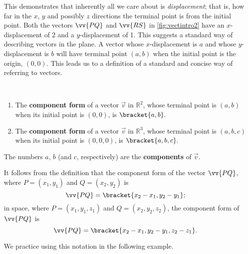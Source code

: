 This demonstrates that inherently all we care about is \emph{displacement}; that is, how far in the $x$, $y$ and possibly $z$ directions the terminal point is from the initial point. Both the vectors $\vv{PQ}$ and $\vv{RS}$ in \autoref{fig:vectintro2} have an $x$-displacement of 2 and a $y$-displacement of 1. This suggests a standard way of describing vectors in the plane. A vector whose $x$-displacement is $a$ and whose $y$-displacement is $b$ will have terminal point $(a,b)$ when the initial point is the origin, $(0,0)$. This leads us to a definition of a standard and concise way of referring to vectors.

\begin{definition}\label{def:vector_component}
\mbox{}\\[-2\baselineskip]\begin{enumerate}
	\item The \textbf{component form} of a vector $\vec{v}$ in $\mathbb{R}^2$, whose terminal point is $(a,b)$ when its initial point is $(0,0)$, is $\bracket{a,b}.$ 
	
	\item The \textbf{component form} of a vector $\vec{v}$ in $\mathbb{R}^3$, whose terminal point is $(a,b,c)$ when its initial point is $(0,0,0)$, is $\bracket{a,b,c}.$ 
	
\end{enumerate}
The numbers $a$, $b$ (and $c$, respectively) are the \textbf{components} of $\vec v$.
\end{definition}


It follows from the definition that the component form of the vector $\vv{PQ}$, where $P=(x_1,y_1)$ and $Q=(x_2,y_2)$ is
\[\vv{PQ} =\bracket{x_2-x_1, y_2-y_1};\]
in space, where $P=(x_1,y_1,z_1)$ and $Q=(x_2,y_2,z_2)$, the component form of $\vv{PQ}$ is	\[\vv{PQ} =\bracket{x_2-x_1, y_2-y_1,z_2-z_1}.\]


We practice using this notation in the following example.

